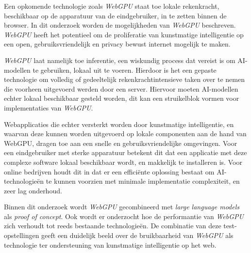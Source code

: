 \bigbreak{}

Een opkomende technologie zoals \textit{WebGPU} staat toe lokale rekenkracht, beschikbaar op de apparatuur van de eindgebruiker, in te zetten binnen de browser. In dit onderzoek worden de mogelijkheden van \textit{WebGPU} beschreven. \textit{WebGPU} heeft het potentieel om de proliferatie van kunstmatige intelligentie op een open, gebruiksvriendelijk en privacy bewust internet mogelijk te maken.

\bigbreak{}

\textit{WebGPU} laat namelijk toe inferentie, een wiskundig process dat vereist is om AI-modellen te gebruiken, lokaal uit te voeren. Hierdoor is het een gepaste technologie om volledig of gedeeltelijk rekenkrachtintensieve taken over te nemen die voorheen uitgevoerd werden door een server. Hiervoor moeten AI-modellen echter lokaal beschikbaar gesteld worden, dit kan een struikelblok vormen voor implementaties van \textit{WebGPU}.

\bigbreak{}

Webapplicaties die echter versterkt worden door kunstmatige intelligentie, en waarvan deze kunnen worden uitgevoerd op lokale componenten aan de hand van WebGPU, dragen toe aan een snelle en gebruiksvriendelijke omgevingen. Voor een eindgebruiker met sterke apparatuur betekent dit dat een applicatie met deze complexe software lokaal beschikbaar wordt, en makkelijk te installeren is. Voor online bedrijven houdt dit in dat er een efficiënte oplossing bestaat om AI-technologieën te kunnen voorzien met minimale implementatie complexiteit, en zeer lag onderhoud.

\bigbreak{}

Binnen dit onderzoek wordt \textit{WebGPU} gecombineerd met \textit{large language models} als \textit{proof of concept}. Ook wordt er onderzocht hoe de performantie van \textit{WebGPU} zich verhoudt tot reeds bestaande technologieën. De combinatie van deze test-op\-ste\-llingen geeft een duidelijk beeld over de bruikbaarheid van \textit{WebGPU} als technologie ter ondersteuning van kunstmatige intelligentie op het web.